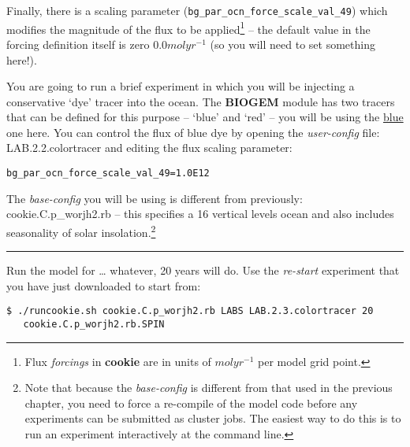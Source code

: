 Finally, there is a scaling parameter (\texttt{bg\_par\_ocn\_force\_scale\_val\_49}) which modifies the magnitude of the flux to be applied\footnote{Flux \textit{forcings} in \textbf{cookie} are in units of \(mol yr^{-1}\) per model grid point.} -- the default value in the forcing definition itself is zero \(0.0 mol yr^{-1}\) (so you will need to set something here!).

\newpage 

\noindent You are going to run a brief experiment in which you will be injecting a conservative ‘dye’ tracer into the ocean. The \textbf{BIOGEM} module has two tracers that can be defined for this purpose – ‘blue’ and ‘red’ -- you will be using the \uline{blue} one here. You can control the flux of blue dye by opening the \textit{user-config} file: \textsf{\footnotesize LAB.2.2.colortracer} and editing the flux scaling parameter:

\vspace{-2mm}\small\begin{verbatim}
bg_par_ocn_force_scale_val_49=1.0E12
\end{verbatim}\normalsize\vspace{-2mm}

\vspace{1mm}
The \textit{base-config} you will be using is different from previously: \textsf{\footnotesize cookie.C.p\_worjh2.rb} – this specifies a 16 vertical levels ocean and also includes seasonality of solar insolation.\footnote{Note that because the \textit{base-config} is different from that used in the previous chapter, you need to force a re-compile of the model code before any experiments can be submitted as cluster jobs. The easiest way to do this is to run an experiment interactively at the command line.}

\vspace{1mm}\noindent\rule{4cm}{0.5pt}\vspace{2mm}

\noindent Run the model for … whatever, 20 years will do. Use the \textit{re-start} experiment that you have just downloaded to start from:

\vspace{-2mm}\small\begin{verbatim}
$ ./runcookie.sh cookie.C.p_worjh2.rb LABS LAB.2.3.colortracer 20 
   cookie.C.p_worjh2.rb.SPIN
\end{verbatim}\normalsize\vspace{-2mm}

